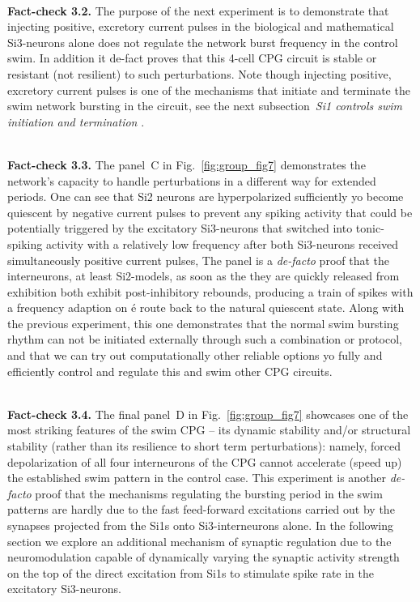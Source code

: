 \documentclass[nofootinbib,aip,amsmath,amssymb,reprint,twocolumn,10pt]{revtex4-2}
\begin{document}
~\\
{\bf Fact-check 3.2.} The purpose of the next experiment is to demonstrate that injecting positive, excretory current pulses in the biological and mathematical Si3-neurons alone does not regulate the network burst frequency in the control swim. In addition it de-fact proves that this 4-cell CPG circuit is stable or resistant (not resilient) to such perturbations. Note though injecting positive, excretory current pulses is one of the mechanisms that initiate and terminate the swim network bursting in the circuit, see the next subsection~{\em Si1 controls swim initiation and termination} . 


~\\
{\bf Fact-check 3.3.} The panel~C in Fig.~\ref{fig:group_fig7} demonstrates the network's capacity to handle perturbations in a different way for extended periods. One can see that Si2 neurons are hyperpolarized sufficiently yo become quiescent by negative current pulses to prevent any spiking activity that could be potentially triggered by the excitatory Si3-neurons that switched into tonic-spiking activity with a relatively low frequency after both Si3-neurons received simultaneously positive current pulses, The panel is a {\em de-facto} proof that the interneurons, at least Si2-models, as soon as the they are quickly released from exhibition both exhibit post-inhibitory rebounds, producing a train of spikes with a frequency adaption on \'e route back to the natural quiescent state.  Along with the previous experiment, this one demonstrates that the normal swim bursting rhythm can not be initiated externally through such a combination or protocol, and that we can try out computationally other reliable options yo fully and efficiently control and regulate this and swim other CPG circuits.        

~\\
{\bf Fact-check 3.4.} The final panel~D in Fig.~\ref{fig:group_fig7} showcases one of the most striking features of the swim CPG -- its dynamic stability and/or structural stability (rather than its resilience to short term perturbations): namely, forced depolarization of all four interneurons of the CPG cannot accelerate (speed up) the established swim pattern in the control case. This experiment is another {\em de-facto} proof that the mechanisms regulating the bursting period in the swim patterns are hardly due to the fast feed-forward excitations carried out by the synapses projected from the Si1s onto Si3-interneurons alone. In the following section we explore an additional  mechanism of synaptic regulation due to the neuromodulation capable of dynamically varying the synaptic activity strength on the top of the direct excitation from Si1s to stimulate spike rate in the excitatory Si3-neurons.      
\end{document}
